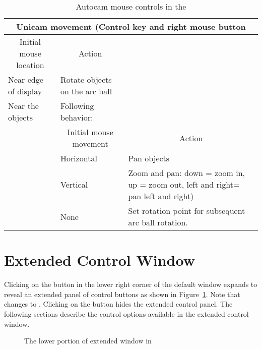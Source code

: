 \bigskip

\begin{table}
\begin{center}
\begin{tabular}{|l|l|p{3in}|} \hline
    \multicolumn{3}{|c|}{\large Unicam movement (Control key and right mouse
    button} \\ \hline \hline
    \multicolumn{1}{|c|}{Initial mouse location} & 
    \multicolumn{1}{|c|}{Action} & \\ 
    \hline
    Near edge of display & Rotate objects on the arc ball & \\
    Near the objects & Following behavior: & \\
    \hline
    & \multicolumn{1}{|c|}{Initial mouse movement} & 
    \multicolumn{1}{|c|}{Action}\\ \hline
    & Horizontal & Pan objects \\ 
    & Vertical & Zoom and pan: down = zoom in, up = zoom
    out, left and right= pan left and right) \\
    & None & Set rotation point for subsequent arc ball rotation.\\
    \hline
\end{tabular}
\caption{\label{tab:view-unicam} Autocam mouse controls in the \viewer{}}
\end{center}
\end{table}



\section{Extended Control Window}
\label{sec:view-control} 

Clicking on the \button{[+]} button in the lower right corner of the
default \viewer{} window expands to reveal an extended panel of
control buttons as shown in Figure~\ref{fig:extviewwindow}.  Note that
\button{[+]} changes to \button{[-]}.  Clicking on the \button{[-]}
button hides the extended control panel.  The following sections
describe the control options available in the extended control
window.

\begin{figure}[htb]
  \begin{makeimage}
  \end{makeimage}
  \extendedwindow
  \caption{\label{fig:extviewwindow} The lower portion of extended
    \viewer{} window in \SR{}} 
\end{figure}


